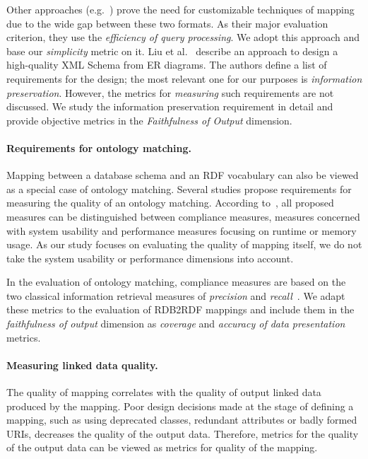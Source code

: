 Other approaches (e.g.\ \cite{he1999relational}) prove the need for customizable techniques of mapping due to the wide gap between these two formats.
As their major evaluation criterion, they use the \textit{efficiency of query processing}.
We adopt this approach and base our \textit{simplicity} metric on it.
Liu et al.~\cite{liu2006designing} describe an approach to design a high-quality XML Schema from ER diagrams.
The authors define a list of requirements for the design; the most relevant one for our purposes is \emph{information preservation}.
However, the metrics for \emph{measuring} such requirements are not discussed.
We study the information preservation requirement in detail and provide objective metrics in the \emph{Faithfulness of Output} dimension.

\paragraph{Requirements for ontology matching.}
Mapping between a database schema and an RDF vocabulary can also be viewed as a special case of ontology matching.
Several studies propose requirements for measuring the quality of an ontology matching.
According to~\cite{euzenat2007ontology}, all proposed measures can be distinguished between compliance measures, measures concerned with system usability and performance measures focusing on runtime or memory usage.
As our study focuses on evaluating the quality of mapping itself, we do not take the system usability or performance dimensions into account.

In the evaluation of ontology matching, compliance measures are based on the two classical information retrieval measures of \emph{precision} and \emph{recall}~\cite{vanRijsbergen}.
We adapt these metrics to the evaluation of RDB2RDF mappings and include them in the \emph{faithfulness of output} dimension as \emph{coverage} and \emph{accuracy of data presentation} metrics. 

\paragraph{Measuring linked data quality.}
The quality of mapping correlates with the quality of output linked data produced by the mapping.
Poor design decisions made at the stage of defining a mapping, such as using deprecated classes, redundant attributes or badly formed URIs, decreases the quality of the output data.
Therefore, metrics for the quality of the output data can be viewed as metrics for quality of the mapping.

